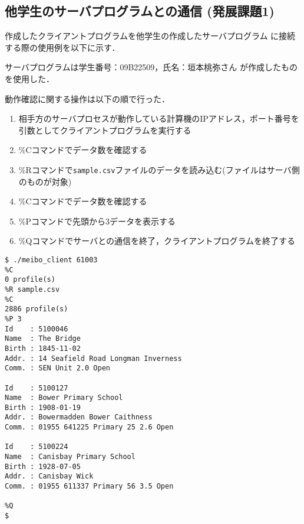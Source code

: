 \subsection{他学生のサーバプログラムとの通信 (発展課題1)}
作成したクライアントプログラムを他学生の作成したサーバプログラム
に接続する際の使用例を以下に示す．

サーバプログラムは学生番号：09B22509，氏名：垣本桃弥さん
が作成したものを使用した．

動作確認に関する操作は以下の順で行った．
\begin{enumerate}
  \item 相手方のサーバプロセスが動作している計算機のIPアドレス，ポート番号を引数としてクライアントプログラムを実行する
  \item \%Cコマンドでデータ数を確認する
  \item \%Rコマンドで\verb|sample.csv|ファイルのデータを読み込む(ファイルはサーバ側のものが対象)
  \item \%Cコマンドでデータ数を確認する
  \item \%Pコマンドで先頭から3データを表示する
  \item \%Qコマンドでサーバとの通信を終了，クライアントプログラムを終了する
\end{enumerate}

\begin{Verbatim}[numbers=none, numbersep=6pt, frame=single,
  fontsize=\small, baselinestretch=0.8]
$ ./meibo_client 61003
%C
0 profile(s)
%R sample.csv
%C
2886 profile(s)
%P 3
Id    : 5100046
Name  : The Bridge
Birth : 1845-11-02
Addr. : 14 Seafield Road Longman Inverness
Comm. : SEN Unit 2.0 Open

Id    : 5100127
Name  : Bower Primary School
Birth : 1908-01-19
Addr. : Bowermadden Bower Caithness
Comm. : 01955 641225 Primary 25 2.6 Open

Id    : 5100224
Name  : Canisbay Primary School
Birth : 1928-07-05
Addr. : Canisbay Wick
Comm. : 01955 611337 Primary 56 3.5 Open

%Q
$
\end{Verbatim}

